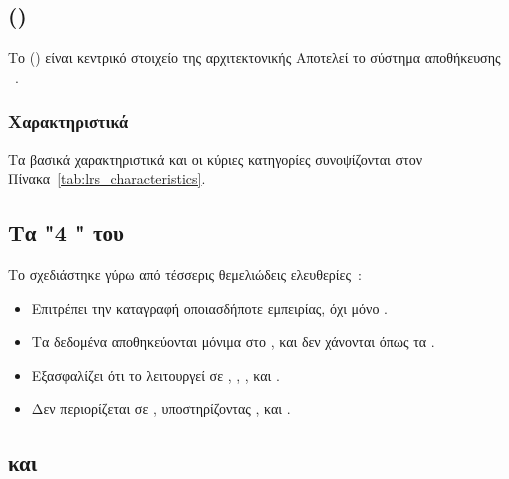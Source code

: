 

\subsection{   ()}
\label{subsec:lrs}

Το    () είναι κεντρικό στοιχείο της αρχιτεκτονικής  Αποτελεί το σύστημα αποθήκευσης  ~\cite{xapicom2024lrs,rustici2023lrs}.

\subsubsection{Χαρακτηριστικά }

Τα βασικά χαρακτηριστικά και οι κύριες κατηγορίες  συνοψίζονται στον Πίνακα~\ref{tab:lrs_characteristics}.



\subsection{Τα "4 " του }
\label{subsec:xapi_freedoms}

Το  σχεδιάστηκε γύρω από τέσσερις θεμελιώδεις ελευθερίες~\cite{adl2013xapi_spec}:

\begin{itemize}
  \item {} Επιτρέπει την καταγραφή οποιασδήποτε εμπειρίας, όχι μόνο .
  \item {} Τα δεδομένα αποθηκεύονται μόνιμα στο , και δεν χάνονται όπως τα .
  \item {} Εξασφαλίζει ότι το  λειτουργεί σε , , ,  και .
  \item {} Δεν περιορίζεται σε , υποστηρίζοντας ,  και .
\end{itemize}

\subsection{  και }
\label{subsec:xapi_profiles}

